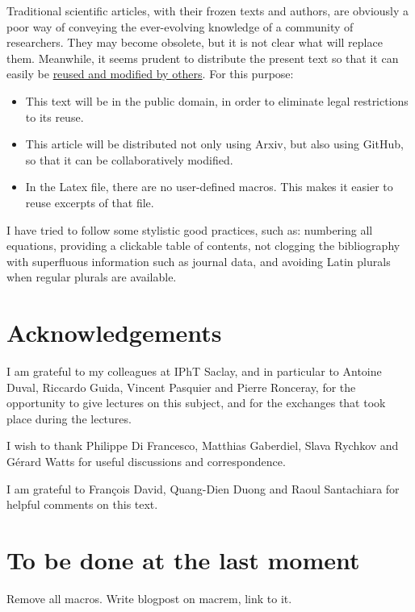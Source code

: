 \documentclass[12pt,a4paper,notitlepage]{report}
\numberwithin{equation}{section}
\theoremstyle{break}
\begin{document}
Traditional scientific articles, with their frozen texts and authors, are obviously a poor way of conveying the ever-evolving knowledge of a community of researchers. They may become obsolete, but it is not clear what will replace them. Meanwhile, it seems prudent to distribute the present text so that it can easily be 
\href{http://researchpracticesandtools.blogspot.fr/2014/02/the-case-for-emancipating-articles-from.html}
{reused and modified by others}. For this purpose:
\begin{itemize}
 \item This text will be in the public domain, in order to eliminate legal restrictions to its reuse. 
\item This article will be distributed not only using Arxiv, but also using GitHub, so that it can be collaboratively modified. 
\item In the Latex file, there are no user-defined macros. This makes it easier to reuse excerpts of that file. 
\end{itemize}

I have tried to follow some stylistic good practices, such as: numbering all equations, providing a clickable table of contents, not clogging the bibliography with superfluous information such as journal data, and avoiding Latin plurals when regular plurals are available.


\section{Acknowledgements}

I am grateful to my colleagues at IPhT Saclay, and in particular to Antoine Duval, Riccardo Guida, Vincent Pasquier and Pierre Ronceray, for the opportunity to give lectures on this subject, and for the exchanges that took place during the lectures.

I wish to thank Philippe Di Francesco, Matthias Gaberdiel, Slava Rychkov and G\'erard Watts for useful discussions and correspondence.

I am grateful to Fran\c{c}ois David, Quang-Dien Duong and Raoul Santachiara for helpful comments on this text.


\section{To be done at the last moment}

Remove all macros. Write blogpost on macrem, link to it.
\end{document}
